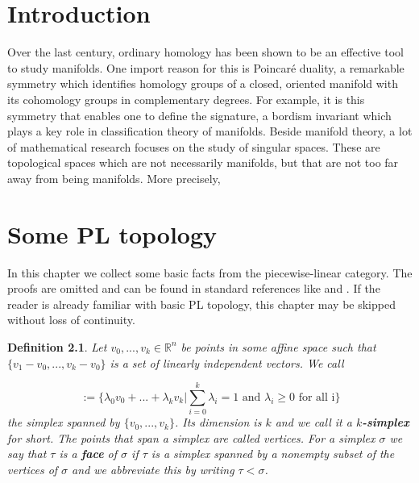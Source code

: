 \documentclass{scrreprt}
\newtheorem{definition}[prop]{Definition}
\begin{document}
\tableofcontents

\chapter{Introduction}

Over the last century, ordinary homology has been shown to be an effective tool to study manifolds. One import reason for this is Poincar\'{e} duality, a remarkable symmetry which identifies homology groups of a closed, oriented manifold with its cohomology groups in complementary degrees. For example, it is this symmetry that enables one to define the signature, a bordism invariant which plays a key role in classification theory of manifolds. Beside manifold theory, a lot of mathematical research focuses on the study of singular spaces. These are topological spaces which are not necessarily manifolds, but that are not too far away from being manifolds. More precisely, 

\chapter{Some PL topology}
\label{sec:Einleitung}

In this chapter we collect some basic facts from the piecewise-linear category. The proofs are omitted and can be found in standard references like \cite{pltopo} and \cite{hatcher}. If the reader is already familiar with basic PL topology, this chapter may be skipped without loss of continuity.

\begin{definition}
Let $v_0,...,v_k \in \mathbb{R}^n$ be points in some affine space such that $\{ v_1-v_0,...,v_k-v_0 \}$ is a set of linearly independent vectors. We call

\begin{equation*}
[v_0,...,v_k] := \Biggl \{  \lambda_0v_0+...+ \lambda_kv_k \Bigg |  \sum_{i=0}^k \lambda_i =1 \text{ and } \lambda_i \geq 0 \text{ for all i} \Biggr \}
\end{equation*}
the simplex spanned by $\{v_0,...,v_k \}$. Its dimension is $k$ and we call it a \textbf{$k$-simplex} for short. The points that span a simplex are called vertices. For a simplex $\sigma$ we say that $\tau$ is a \textbf{face} of $\sigma$ if $\tau$ is a simplex spanned by a nonempty subset of the vertices of $\sigma$ and we abbreviate this by writing $\tau < \sigma$.
\end{definition}
\end{document}
